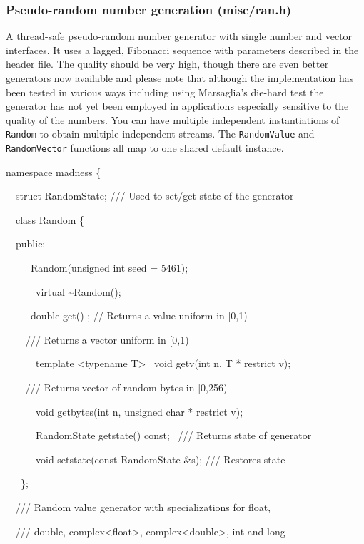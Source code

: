 \documentclass[letterpaper]{article}
\begin{document}
\subsubsection{Pseudo-random number generation (misc/ran.h)}
A thread-safe pseudo-random number generator with single number and vector interfaces. It uses a lagged, Fibonacci
sequence with parameters described in the header file. The quality should be very high, though there are even better
generators now available and please note that although the implementation has been tested in various ways including
using Marsaglia's die-hard test the generator has not yet been employed in applications especially sensitive to the
quality of the numbers. You can have multiple independent instantiations of \texttt{Random} to obtain multiple
independent streams. The \texttt{RandomValue} and \texttt{RandomVector} functions all map to one shared default
instance.

{\ttfamily
namespace madness \{}

{\ttfamily
\ \ struct RandomState; /// Used to set/get state of the generator}

{\ttfamily
\ \ class Random \{}

{\ttfamily
\ \ public:}

{\ttfamily
\ \ \ \ \ Random(unsigned int seed = 5461);}

{\ttfamily
\ \ \ \ \ \ virtual \~{}Random();}

{\ttfamily
\ \ \ \ \ double get() ; // Returns a value uniform in [0,1)}

{\ttfamily
\ \ \ \ /// Returns a vector uniform in [0,1)}

{\ttfamily
\ \ \ \ \ \ template {\textless}typename T{\textgreater} \ void getv(int n, T * restrict v); }

{\ttfamily
\ \ \ \ /// Returns vector of random bytes in [0,256)}

{\ttfamily
\ \ \ \ \ \ void getbytes(int n, unsigned char * restrict v); }

{\ttfamily
\ \ \ \ \ \ RandomState getstate() const; \ /// Returns state of generator}

{\ttfamily
\ \ \ \ \ \ void setstate(const RandomState \&s); /// Restores state}

{\ttfamily
\ \ \ \};}

{\ttfamily
\ \ /// Random value generator with specializations for float,}

{\ttfamily
\ \ /// double, complex{\textless}float{\textgreater}, complex{\textless}double{\textgreater}, int and long}
\end{document}
